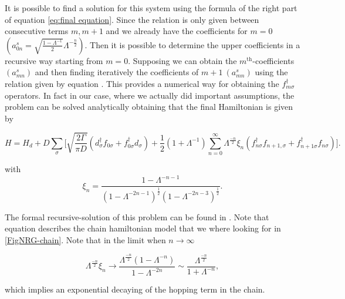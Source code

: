 It is possible to find a solution for this system using the formula of
the right part of equation \ref{eq:final equation}. Since the relation
is only given between consecutive terms $m,m+1$ and we already have
the coefficients for $m=0$ $\left(a_{0n}^{s}=\sqrt{\frac{1-\Lambda^{-1}}{2}}\Lambda^{-\frac{n}{2}}\right).$
Then it is possible to determine the upper coefficients in a recursive way starting
from $m=0$. Supposing we can obtain the $m^{\mbox{th}}$-coefficients
$(a_{mn}^{s})$ and then finding iteratively the coefficients of $m+1\ (a_{mn}^{s})$
using the relation given by equation .
This provides a numerical way for obtaining the $f_{m\sigma}^{\dagger}$
operators. In fact in our case, where we actually did important assumptions,
the problem can be solved analytically obtaining that the final Hamiltonian
is given by 

\begin{equation}
H=H_{d}+D\sum_{\sigma}\Biggl[\sqrt{\frac{2\Gamma}{\pi D}}\left(d_{\sigma}^{\dagger}f_{0\sigma}+f_{0\sigma}^{\dagger}d_{\sigma}\right)+\frac{1}{2}\left(1+\Lambda^{-1}\right)\sum_{n=0}^{\infty}\Lambda^{\frac{-n}{2}}\xi_{n}\left(f_{n\sigma}^{\dagger}f_{n+1,\sigma}+f_{n+1\sigma}^{\dagger}f_{n\sigma}\right)\Biggr].\label{eq:chain-Hamiltonian}
\end{equation}


with 
\[
\xi_{n}=\frac{1-\Lambda^{-n-1}}{\left(1-\Lambda^{-2n-1}\right)^{\frac{1}{2}}\left(1-\Lambda^{-2n-3}\right)^{\frac{1}{2}}}.
\]


The formal recursive-solution of this problem can be found in \citep{bulla_numerical_2008}
. Note that equation  describes the
chain hamiltonian model that we where looking for in \ref{FigNRG-chain}.
Note that in the limit when $n\longrightarrow\infty$ 

\[
\Lambda^{\frac{-n}{2}}\xi_{n}\longrightarrow\frac{\Lambda^{\frac{-n}{2}}\left(1-\Lambda^{-n}\right)}{1-\Lambda^{-2n}}\sim\frac{\Lambda^{\frac{-n}{2}}}{1+\Lambda^{-n}},
\]


which implies an exponential decaying of the hopping term in the chain. 





